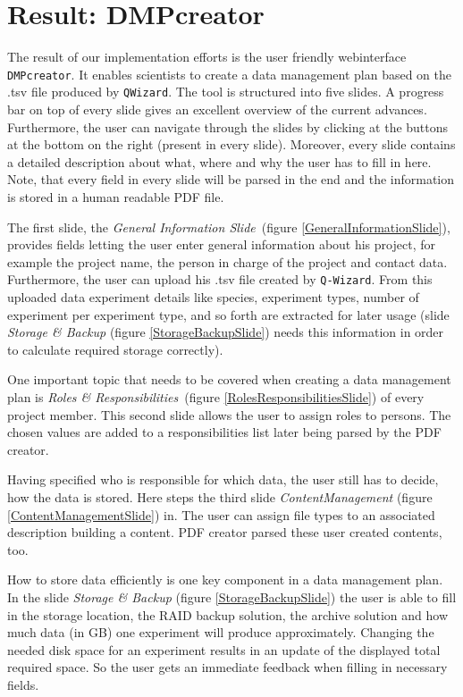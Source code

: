 
\section{Result: DMPcreator}
The result of our implementation efforts is the user friendly webinterface \texttt{DMPcreator}. It enables scientists to create a data management plan based on the .tsv file produced by \texttt{QWizard}. The tool is structured into five slides. A progress bar on top of every slide gives an excellent overview of the current advances. Furthermore, the user can navigate through the slides by clicking at the buttons at the bottom on the right (present in every slide). Moreover, every slide contains a detailed description about what, where and why the user has to fill in here. Note, that every field in every slide will be parsed in the end and the information is stored in a human readable PDF file.\par
The first slide, the \textit{General Information Slide}~(figure \ref{GeneralInformationSlide}), provides fields letting the user enter general information about his project, for example the project name, the person in charge of the project and contact data. Furthermore, the user can upload his .tsv file created by \texttt{Q-Wizard}. From this uploaded data experiment details like species, experiment types, number of experiment per experiment type, and so forth are extracted for later usage (slide \textit{Storage \& Backup} (figure \ref{StorageBackupSlide}) needs this information in order to calculate required storage correctly). \par
One important topic that needs to be covered when creating a data management plan is \textit{Roles \& Responsibilities}~(figure \ref{RolesResponsibilitiesSlide}) of every project member. This second slide allows the user to assign roles to persons. The chosen values are added to a responsibilities list later being parsed by the PDF creator. \par Having specified who is responsible for which data, the user still has to decide, how the data is stored. Here steps the third slide \textit{ContentManagement} (figure \ref{ContentManagementSlide}) in. The user can assign file types to an associated description building a content. PDF creator parsed these user created contents, too. \par
How to store data efficiently is one key component in a data management plan. In the slide \textit{Storage \& Backup} (figure \ref{StorageBackupSlide}) the user is able to fill in the storage location, the RAID backup solution, the archive solution and how much data (in GB) one experiment will produce approximately. Changing the needed disk space for an experiment results in an update of the displayed total required space. So the user gets an immediate feedback when filling in necessary fields. \par
